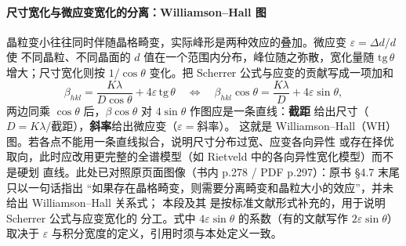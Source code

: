\paragraph{尺寸宽化与微应变宽化的分离：Williamson--Hall 图}
\begin{principle}
晶粒变小往往同时伴随晶格畸变，实际峰形是两种效应的叠加。微应变 $\varepsilon=\Delta d/d$ 使
不同晶粒、不同晶面的 $d$ 值在一个范围内分布，峰位随之弥散，宽化量随 $\mathrm{tg}\,\theta$
增大；尺寸宽化则按 $1/\cos\theta$ 变化。把 Scherrer 公式与应变的贡献写成一项加和
\begin{equation}
\beta_{hkl}=\frac{K\lambda}{D\cos\theta}+4\varepsilon\,\mathrm{tg}\,\theta
\quad\Longleftrightarrow\quad
\beta_{hkl}\cos\theta=\frac{K\lambda}{D}+4\varepsilon\sin\theta ,
\label{eq:ch04c-WH}
\end{equation}
两边同乘 $\cos\theta$ 后，$\beta\cos\theta$ 对 $4\sin\theta$ 作图应是一条直线：\textbf{截距}
给出尺寸（$D=K\lambda/\text{截距}$），\textbf{斜率}给出微应变（$\varepsilon=\text{斜率}$）。
这就是 Williamson--Hall（WH）图。若各点不能用一条直线拟合，说明尺寸分布过宽、应变各向异性
或存在择优取向，此时应改用更完整的全谱模型（如 Rietveld 中的各向异性宽化模型）而不是硬划
直线。此处已对照原页面图像（书内 p.278 / PDF p.297）：原书 §4.7 末尾只以一句话指出
``如果存在晶格畸变，则需要分离畸变和晶粒大小的效应''，并未给出 Williamson--Hall 关系式；
本段及其 是按标准文献形式补充的，用于说明 Scherrer 公式与应变宽化的
分工。式中 $4\varepsilon\sin\theta$ 的系数（有的文献写作 $2\varepsilon\sin\theta$）取决于
$\varepsilon$ 与积分宽度的定义，引用时须与本处定义一致。
\end{principle}

